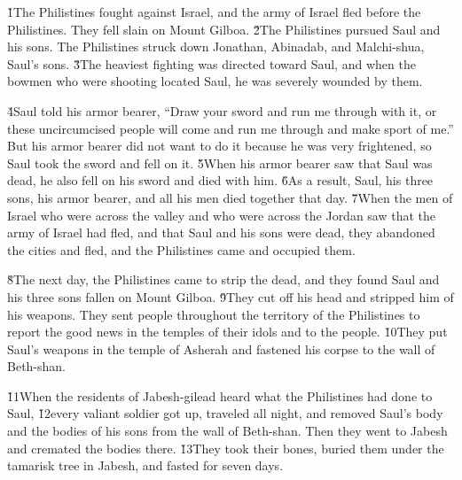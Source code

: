 \v{1}The Philistines fought against Israel, and the army of Israel fled before the Philistines. They fell slain on Mount Gilboa. \v{2}The Philistines pursued Saul and his sons. The Philistines struck down Jonathan, Abinadab, and Malchi-shua, Saul's sons. \v{3}The heaviest fighting was directed toward Saul, and when the bowmen who were shooting located Saul, he was severely wounded by them.

\v{4}Saul told his armor bearer, ``Draw your sword and run me through with it, or these uncircumcised people will come and run me through and make sport of me.'' But his armor bearer did not want to do it because he was very frightened, so Saul took the sword and fell on it. \v{5}When his armor bearer saw that Saul was dead, he also fell on his sword and died with him. \v{6}As a result, Saul, his three sons, his armor bearer, and all his men died together that day. \v{7}When the men of Israel who were across the valley and who were across the Jordan saw that the army of Israel had fled, and that Saul and his sons were dead, they abandoned the cities and fled, and the Philistines came and occupied them.

\v{8}The next day, the Philistines came to strip the dead, and they found Saul and his three sons fallen on Mount Gilboa. \v{9}They cut off his head and stripped him of his weapons. They sent people throughout the territory of the Philistines to report the good news in the temples of their idols and to the people. \v{10}They put Saul's weapons in the temple of Asherah and fastened his corpse to the wall of Beth-shan.

\v{11}When the residents of Jabesh-gilead heard what the Philistines had done to Saul, \v{12}every valiant soldier got up, traveled all night, and removed Saul's body and the bodies of his sons from the wall of Beth-shan. Then they went to Jabesh and cremated the bodies there. \v{13}They took their bones, buried them under the tamarisk tree in Jabesh, and fasted for seven days.
